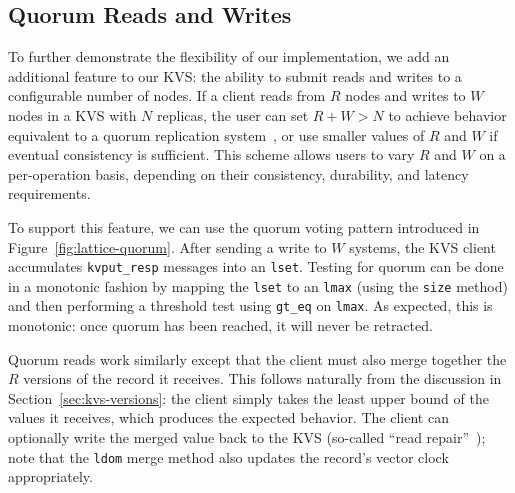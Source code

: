 \subsection{Quorum Reads and Writes}
To further demonstrate the flexibility of our implementation, we add an
additional feature to our KVS: the ability to submit reads and writes to a
configurable number of nodes. If a client reads from $R$ nodes and writes to $W$
nodes in a KVS with $N$ replicas, the user can set $R + W > N$ to achieve
behavior equivalent to a quorum replication system~\cite{Gifford1979}, or use
smaller values of $R$ and $W$ if eventual consistency is sufficient. This scheme
allows users to vary $R$ and $W$ on a per-operation basis, depending on their
consistency, durability, and latency requirements.

To support this feature, we can use the \lang quorum voting pattern
introduced in Figure~\ref{fig:lattice-quorum}. After sending a write to $W$
systems, the KVS client accumulates \texttt{kvput\_resp} messages into an
\texttt{lset}. Testing for quorum can be done in a monotonic fashion by mapping
the \texttt{lset} to an \texttt{lmax} (using the \texttt{size} method) and then
performing a threshold test using \texttt{gt\_eq} on \texttt{lmax}. As expected,
this is monotonic: once quorum has been reached, it will never be retracted.

Quorum reads work similarly except that the client must also merge together the
$R$ versions of the record it receives. This follows naturally from the
discussion in Section~\ref{sec:kvs-versions}: the client simply takes the least
upper bound of the values it receives, which produces the expected behavior. The
client can optionally write the merged value back to the KVS (so-called ``read
repair''~\cite{DeCandia2007}); note that the \texttt{ldom} merge method also
updates the record's vector clock appropriately.
